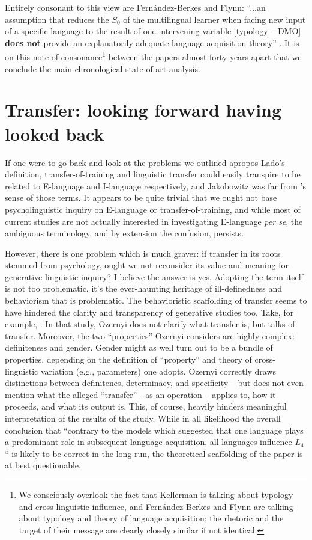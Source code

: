 \documentclass{article}
\begin{document}
Entirely consonant to this view are Fernández-Berkes and Flynn: “...an assumption that reduces the $S_0$ of the multilingual learner when facing new input of a specific language to  the result of one intervening variable [typology -- DMO] \textbf{does not} provide an explanatorily adequate language acquisition theory” \citep[][p. 31, emphasis added]{fernandez-berkes_vindicating_2021}. It is on this note of consonance\footnote{We consciously overlook the fact that Kellerman is talking about typology and cross-linguistic influence, and Fernández-Berkes and Flynn are talking about typology and theory of language acquisition; the rhetoric and the target of their message are clearly closely similar if not identical.} between the papers almost forty years apart that we conclude the main chronological state-of-art analysis.

\section{Transfer: looking forward having looked back} \label{transf-forw-back}

If one were to go back and look at the problems we outlined apropos Lado’s definition, transfer-of-training and linguistic transfer could easily transpire to be related to E-language and I-language respectively, and Jakobowitz was far from \cite{chomsky_aspects_1965}'s sense of those terms. It appears to be quite trivial that we ought not base psycholinguistic inquiry on E-language or transfer-of-training, and while most of current studies are not actually interested in investigating E-language \textit{per se}, the ambiguous terminology, and by extension the confusion, persists.

However, there is one problem which is much graver: if transfer in its roots stemmed from psychology, ought we not reconsider its value and meaning for generative linguistic inquiry? I believe the answer is yes. Adopting the term itself is not too problematic, it's the ever-haunting heritage of ill-definedness and behaviorism that is problematic. The behavioristic scaffolding of transfer seems to have hindered the clarity and transparency of generative studies too. Take, for example, \cite{ozernyi_l1_2021}. In that study, Ozernyi does not clarify what transfer is, but talks of transfer. Moreover, the two ``properties'' Ozernyi considers are highly complex: definiteness and gender. Gender might as well turn out to be a bundle of properties, depending on the definition of ``property'' and theory of cross-linguistic variation (e.g., parameters) one adopts. Ozernyi correctly draws distinctions between definitenes, determinacy, and specificity -- but does not even mention what the alleged ``transfer'' - as an operation -- applies to, how it proceeds, and what its output is. This, of course, heavily hinders meaningful interpretation of the results of the study. While in all likelihood the overall conclusion that ``contrary to the models which suggested that one language plays a predominant role in subsequent language acquisition, all languages influence $L_4$`` \citep[][p. 21]{ozernyi_l1_2021} is likely to be correct in the long run, the theoretical scaffolding of the paper is at best questionable.
\end{document}
